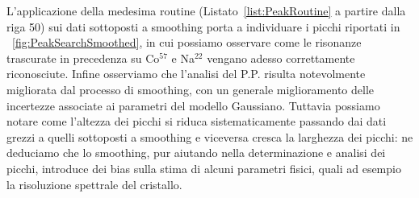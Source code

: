 \vfill

\noindent L'applicazione della medesima routine (Listato~\ref{list:PeakRoutine} a partire dalla riga 50) sui dati sottoposti a smoothing porta a individuare i picchi riportati in \figurename~\ref{fig:PeakSearchSmoothed}, in cui possiamo osservare come le risonanze trascurate in precedenza su Co$^{57}$ e Na$^{22}$ vengano adesso correttamente riconosciute. Infine osserviamo che l'analisi del P.P. risulta notevolmente migliorata dal processo di smoothing, con un generale miglioramento delle incertezze associate ai parametri del modello Gaussiano. Tuttavia possiamo notare come l'altezza dei picchi si riduca sistematicamente passando dai dati grezzi a quelli sottoposti a smoothing e viceversa cresca la larghezza dei picchi: ne deduciamo che lo smoothing, pur aiutando nella determinazione e analisi dei picchi, introduce dei bias sulla stima di alcuni parametri fisici, quali ad esempio la risoluzione spettrale del cristallo.

\vfill

